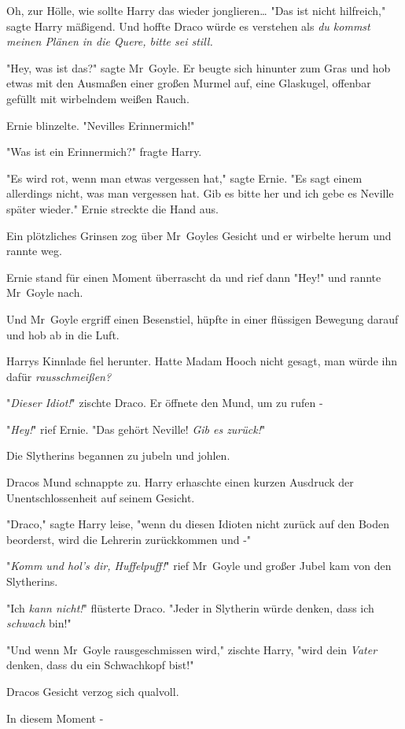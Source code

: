 {Oh, zur Hölle, wie sollte Harry das wieder jonglieren… "Das ist nicht hilfreich," sagte Harry mäßigend. Und hoffte Draco würde es verstehen als \emph{du kommst meinen Plänen in die Quere, bitte sei still.}

"Hey, was ist das?" sagte Mr~Goyle. Er beugte sich hinunter zum Gras und hob etwas mit den Ausmaßen einer großen Murmel auf, eine Glaskugel, offenbar gefüllt mit wirbelndem weißen Rauch.

Ernie blinzelte. "Nevilles Erinnermich!"

"Was ist ein Erinnermich?" fragte Harry.

"Es wird rot, wenn man etwas vergessen hat," sagte Ernie. "Es sagt einem allerdings nicht, was man vergessen hat. Gib es bitte her und ich gebe es Neville später wieder." Ernie streckte die Hand aus.

Ein plötzliches Grinsen zog über Mr~Goyles Gesicht und er wirbelte herum und rannte weg.

Ernie stand für einen Moment überrascht da und rief dann "Hey!" und rannte Mr~Goyle nach.

Und Mr~Goyle ergriff einen Besenstiel, hüpfte in einer flüssigen Bewegung darauf und hob ab in die Luft.

Harrys Kinnlade fiel herunter. Hatte Madam Hooch nicht gesagt, man würde ihn dafür \emph{rausschmeißen?}

"\emph{Dieser Idiot!}" zischte Draco. Er öffnete den Mund, um zu rufen -

"\emph{Hey!}" rief Ernie. "Das gehört Neville! \emph{Gib es zurück!}"

Die Slytherins begannen zu jubeln und johlen.

Dracos Mund schnappte zu. Harry erhaschte einen kurzen Ausdruck der Unentschlossenheit auf seinem Gesicht.

"Draco," sagte Harry leise, "wenn du diesen Idioten nicht zurück auf den Boden beorderst, wird die Lehrerin zurückkommen und -"

"\emph{Komm und hol's dir, Huffelpuff!}" rief Mr~Goyle und großer Jubel kam von den Slytherins.

"Ich \emph{kann nicht!}" flüsterte Draco. "Jeder in Slytherin würde denken, dass ich \emph{schwach} bin!"

"Und wenn Mr~Goyle rausgeschmissen wird," zischte Harry, "wird dein \emph{Vater} denken, dass du ein Schwachkopf bist!"

Dracos Gesicht verzog sich qualvoll.

In diesem Moment -

}
